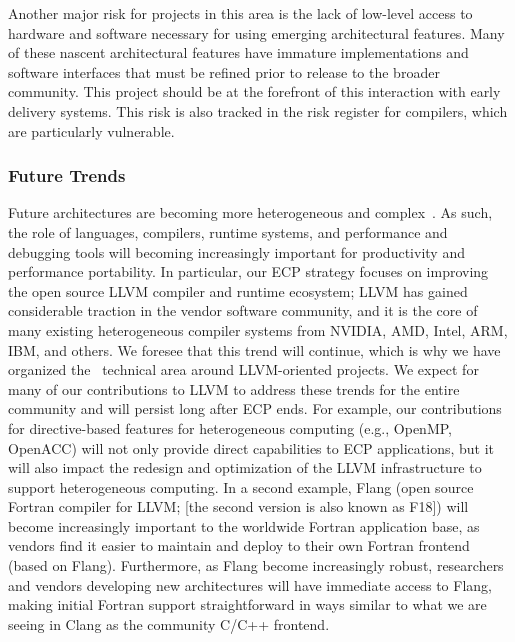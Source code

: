Another major risk for projects in this area is the lack of low-level access to hardware and software necessary for using emerging architectural features. Many of these nascent architectural features have immature implementations and software interfaces that must be refined prior to release to the broader community. This project should be at the forefront of this interaction with early delivery systems. This risk is also tracked in the risk register for compilers, which are particularly vulnerable.

\subsubsection{Future Trends}

Future architectures are becoming more heterogeneous and complex~\cite{vetter:2018:extreme}. As such, the role of languages, compilers, runtime systems, and performance and debugging tools will becoming increasingly important for productivity and performance portability. 
%
In particular, our ECP strategy focuses on improving the open source LLVM compiler and runtime ecosystem; LLVM has gained considerable traction in the vendor software community, and it is the core of many existing heterogeneous compiler systems from NVIDIA, AMD, Intel, ARM, IBM, and others.  We foresee that this trend will continue, which is why we have organized the \tools\ technical area around LLVM-oriented projects.  
%
We expect for many of our contributions to LLVM to address these trends for the entire community and will persist long after ECP ends. 
%
For example, our contributions for directive-based features for heterogeneous computing (e.g., OpenMP, OpenACC) will not only provide direct capabilities to ECP applications, but it will also impact the redesign and optimization of the LLVM infrastructure to support heterogeneous computing.
%
In a second example, Flang (open source Fortran compiler for LLVM; [the second version is also known as F18]) will become increasingly important to the worldwide Fortran application base, as vendors find it easier to maintain and deploy to their own Fortran frontend (based on Flang).  
%
Furthermore, as Flang become increasingly robust, researchers and vendors developing new architectures will have immediate access to Flang, making initial Fortran support straightforward in ways similar to what we are seeing in Clang as the community C/C++ frontend.

%
